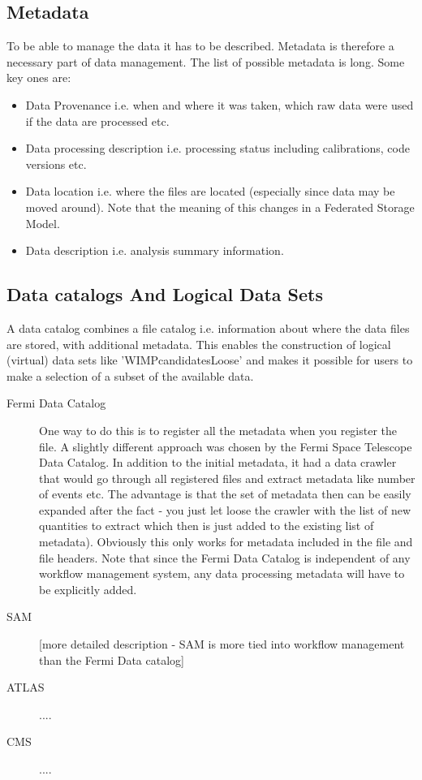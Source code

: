\subsection{Metadata}
To be able to manage the data it has to be described. Metadata is therefore a necessary part of data management. The 
list of possible metadata is long. Some key ones are:

\begin{itemize}
\item Data Provenance i.e. when and where it was taken, which raw data were used if the data are processed etc.
\item Data processing description i.e. processing status including calibrations, code versions etc.
\item Data location i.e. where the files are located (especially since data may be moved around). Note that the meaning of this changes in a 
Federated Storage Model. 
\item Data description i.e. analysis summary information.
\end{itemize}



\subsection{Data catalogs And Logical Data Sets}
A data catalog combines a file catalog i.e. information about where the data files are stored, with additional metadata.
This enables the construction of logical (virtual) data sets like 'WIMPcandidatesLoose' and makes it possible for users to 
make a selection of a subset of the available data.

\begin{description}
\item[Fermi Data Catalog] One way to do this is to register all the metadata when you register the file. A slightly
different approach was chosen by the Fermi Space Telescope Data Catalog. In addition to the initial metadata, it had a
data crawler that would go through all registered files and extract metadata like number of events etc. The advantage is
that the set of metadata then can be easily expanded after the fact - you just let loose the crawler with the list
of new quantities to extract which then is just added to the existing list of metadata). Obviously this only works for 
metadata included in the file and file headers.  Note that since the Fermi 
Data Catalog is independent of any workflow management system, any data processing metadata will have to be explicitly added. 


\item[SAM] [more detailed description - SAM is more tied into workflow management than the Fermi Data catalog]

\item[ATLAS] ....

\item[CMS] ....

\end{description}



